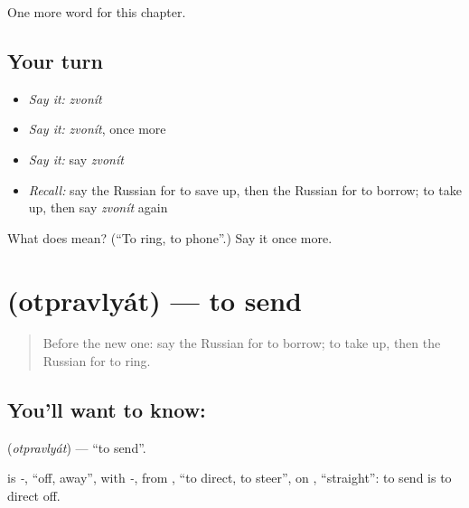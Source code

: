 \begin{grammarlens}[title={What you've built}]
One more word for this chapter.
\end{grammarlens}

\subsection*{Your turn}
\begin{itemize}
\raggedright
  \item \emph{Say it:} \emph{zvonít}
  \item \emph{Say it:} \emph{zvonít}, once more
  \item \emph{Say it:} say \emph{zvonít}
  \item \emph{Recall:} say the Russian for to save up, then the Russian for to borrow; to take up, then say \emph{zvonít} again
\end{itemize}

\begin{tcolorbox}[breakable,colback=teal!4,colframe=teal!35!black,title={Before you move on}]
What does  mean? (\textquotedblleft{}To ring, to phone\textquotedblright{}.) Say it once more.
\end{tcolorbox}
\section[\texorpdfstring{\ru{отправлять} (otpravlyát)}{отправлять (otpravlyát)}]{ (otpravlyát) — to send}

\label{lesson:RU-C232-otpravlyat}



\begin{quote}
Before the new one: say the Russian for to borrow; to take up, then the Russian for to ring.
\end{quote}

\subsection*{You'll want to know: }
\textbf{} (\emph{otpravlyát}) — \textquotedblleft{}to send\textquotedblright{}.

\begin{cousinweb}
\textbf{} is \emph{-}, \textquotedblleft{}off, away\textquotedblright{}, with \emph{-}, from \emph{}, \textquotedblleft{}to direct, to steer\textquotedblright{}, on \emph{}, \textquotedblleft{}straight\textquotedblright{}: to send is to direct off.
\end{cousinweb}

